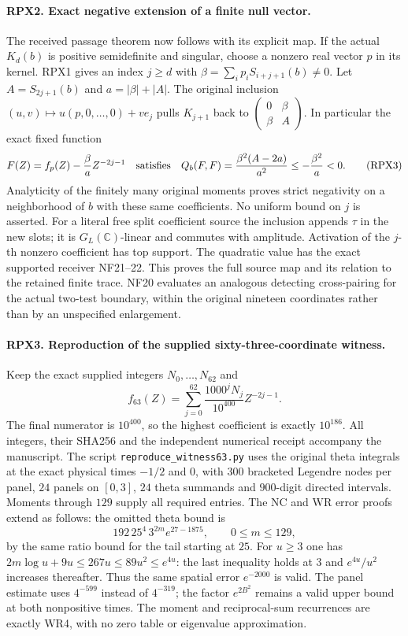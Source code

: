 \paragraph{RPX2. Exact negative extension of a finite null vector.}
The received passage theorem now follows with its explicit map.
If the actual $K_d(b)$ is positive semidefinite and singular,
choose a nonzero real vector $p$ in its kernel. RPX1 gives an
index $j\ge d$ with $\beta=\sum_i p_iS_{i+j+1}(b)\ne0$.
Let $A=S_{2j+1}(b)$ and $a=|\beta|+|A|$. The original inclusion
$(u,v)\mapsto u(p,0,\ldots,0)+ve_j$ pulls $K_{j+1}$ back to
$\left(\begin{smallmatrix}0&\beta\\\beta&A\end{smallmatrix}\right)$.
In particular the exact fixed function
\[
 F(Z)=f_p(Z)-\frac{\beta}{a}Z^{-2j-1}
 \quad\hbox{satisfies}\quad
 Q_b(F,F)=\frac{\beta^2(A-2a)}{a^2}
 \le-\frac{\beta^2}{a}<0.
 \tag{RPX3}
\]
Analyticity of the finitely many original moments proves strict
negativity on a neighborhood of $b$ with these same coefficients.
No uniform bound on $j$ is asserted. For a literal free split
coefficient source the inclusion appends $\tau$ in the new slots;
it is $G_L(\mathbb C)$-linear and commutes with amplitude.
Activation of the $j$-th nonzero coefficient has top support.
The quadratic value has the exact supported receiver NF21--22.
This proves the full source map and its relation to the retained
finite trace. NF20 evaluates an analogous detecting cross-pairing
for the actual two-test boundary, within the original nineteen
coordinates rather than by an unspecified enlargement.

\paragraph{RPX3. Reproduction of the supplied sixty-three-coordinate witness.}
Keep the exact supplied integers $N_0,\ldots,N_{62}$ and
\[
 f_{63}(Z)=\sum_{j=0}^{62}\frac{1000^jN_j}{10^{400}}Z^{-2j-1}.
 \tag{RPX4}
\]
The final numerator is $10^{400}$, so the highest coefficient
is exactly $10^{186}$. All integers, their SHA256 and the
independent numerical receipt accompany the manuscript. The
script \texttt{reproduce\_witness63.py} uses the original theta
integrals at the exact physical times $-1/2$ and $0$, with
$300$ bracketed Legendre nodes per panel, $24$ panels on $[0,3]$,
$24$ theta summands and $900$-digit directed intervals. Moments
through $129$ supply all required entries. The NC and WR error
proofs extend as follows: the omitted theta bound is
\[
 192\,25^4\,3^{2m}e^{27-1875},\qquad 0\le m\le129,
 \tag{RPX5}
\]
by the same ratio bound for the tail starting at $25$.
For $u\ge3$ one has
$2m\log u+9u\le267u\le89u^2\le e^{4u}$: the last inequality
holds at $3$ and $e^{4u}/u^2$ increases thereafter. Thus the
same spatial error $e^{-2000}$ is valid. The panel estimate
uses $4^{-599}$ instead of $4^{-319}$; the factor $e^{2B^2}$
remains a valid upper bound at both nonpositive times.
The moment and reciprocal-sum recurrences are exactly WR4,
with no zero table or eigenvalue approximation.


